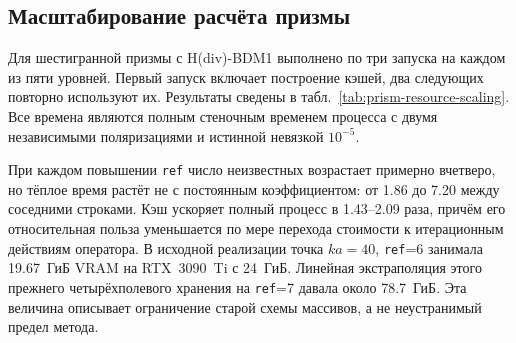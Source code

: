 \documentclass[12pt,a4paper]{article}
\begin{document}
\subsection{Масштабирование расчёта призмы}

Для шестигранной призмы с H(div)-BDM1 выполнено по три запуска на каждом из
пяти уровней. Первый запуск включает построение кэшей, два следующих повторно
используют их. Результаты сведены в табл.~\ref{tab:prism-resource-scaling}.
Все времена являются полным стеночным временем процесса с двумя независимыми
поляризациями и истинной невязкой $10^{-5}$.

\begin{table}[H]
\centering
\caption{Измеренное масштабирование производственного смешанного пути. Тёплое
время --- среднее двух повторов с готовыми кэшами.}
\label{tab:prism-resource-scaling}
\end{table}

При каждом повышении \texttt{ref} число неизвестных возрастает примерно
вчетверо, но тёплое время растёт не с постоянным коэффициентом: от 1.86 до
7.20 между соседними строками. Кэш ускоряет полный процесс в 1.43--2.09 раза,
причём его относительная польза уменьшается по мере перехода стоимости к
итерационным действиям оператора. В исходной реализации точка $ka=40$,
\texttt{ref}=6 занимала 19.67~ГиБ VRAM на RTX~3090~Ti с 24~ГиБ. Линейная
экстраполяция этого прежнего четырёхполевого хранения на \texttt{ref}=7 давала
около 78.7~ГиБ. Эта величина описывает ограничение старой схемы массивов, а не
неустранимый предел метода.
\end{document}
